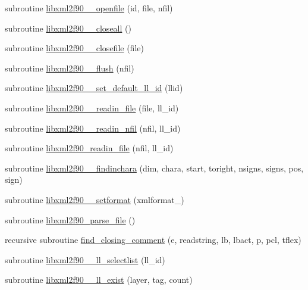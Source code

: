 \begin{DoxyCompactItemize}
\item 
subroutine \hyperlink{libxml2f90_8f90__pp_8f90_afd27bcb20bad3d7a8445a9090dcd8d01}{libxml2f90\+\_\+\+\_\+openfile} (id, file, nfil)
\item 
subroutine \hyperlink{libxml2f90_8f90__pp_8f90_aaea8089848b0bc51a87636d0afb1a544}{libxml2f90\+\_\+\+\_\+closeall} ()
\item 
subroutine \hyperlink{libxml2f90_8f90__pp_8f90_a33bae24588e3ae2ed3a7f9756c6845f0}{libxml2f90\+\_\+\+\_\+closefile} (file)
\item 
subroutine \hyperlink{libxml2f90_8f90__pp_8f90_a959df5c9fc5516bfc223af92a5407f8e}{libxml2f90\+\_\+\+\_\+flush} (nfil)
\item 
subroutine \hyperlink{libxml2f90_8f90__pp_8f90_ab64e354c556b4f4e6f258a7573b3fb95}{libxml2f90\+\_\+\+\_\+set\+\_\+default\+\_\+ll\+\_\+id} (llid)
\item 
subroutine \hyperlink{libxml2f90_8f90__pp_8f90_a9bbaec04b4014748bfea3b37b0a13f4a}{libxml2f90\+\_\+\+\_\+readin\+\_\+file} (file, ll\+\_\+id)
\item 
subroutine \hyperlink{libxml2f90_8f90__pp_8f90_affef5dd7f09b41951ccedbf9e0c48bc0}{libxml2f90\+\_\+\+\_\+readin\+\_\+nfil} (nfil, ll\+\_\+id)
\item 
subroutine \hyperlink{libxml2f90_8f90__pp_8f90_ae414619cb8c245cec37ab69b1acd4482}{libxml2f90\+\_\+readin\+\_\+file} (nfil, ll\+\_\+id)
\item 
subroutine \hyperlink{libxml2f90_8f90__pp_8f90_a32693bbc0bcd62439a95f4e0a2d4da6d}{libxml2f90\+\_\+\+\_\+findinchara} (dim, chara, start, toright, nsigns, signs, pos, sign)
\item 
subroutine \hyperlink{libxml2f90_8f90__pp_8f90_a2b331dda347708a2db3459b365b848dc}{libxml2f90\+\_\+\+\_\+setformat} (xmlformat\+\_\+)
\item 
subroutine \hyperlink{libxml2f90_8f90__pp_8f90_a41bf2706485a325b4b1515c83ac50a67}{libxml2f90\+\_\+parse\+\_\+file} ()
\item 
recursive subroutine \hyperlink{libxml2f90_8f90__pp_8f90_a2db841b17a0ef4d76e4b31f4ff479f4c}{find\+\_\+closing\+\_\+comment} (e, readstring, lb, lbact, p, pcl, tflex)
\item 
subroutine \hyperlink{libxml2f90_8f90__pp_8f90_aa648c34edeb1a504525200e1aed59f18}{libxml2f90\+\_\+\+\_\+ll\+\_\+selectlist} (ll\+\_\+id)
\item 
subroutine \hyperlink{libxml2f90_8f90__pp_8f90_a3693c7841e7cf085873b2193e4eb51cf}{libxml2f90\+\_\+\+\_\+ll\+\_\+exist} (layer, tag, count)
\item 

\end{DoxyCompactItemize}
